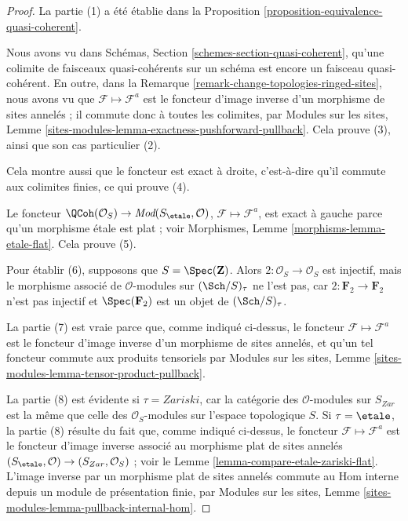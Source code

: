 \begin{proof}
La partie (1) a été établie dans la
Proposition \ref{proposition-equivalence-quasi-coherent}.

\medskip\noindent
Nous avons vu dans Schémas, Section
\ref{schemes-section-quasi-coherent}, qu'une colimite de faisceaux
quasi-cohérents sur un schéma est encore un faisceau quasi-cohérent.
En outre, dans la Remarque
\ref{remark-change-topologies-ringed-sites}, nous avons vu que
$\mathcal{F} \mapsto \mathcal{F}^a$ est le foncteur d'image inverse d'un
morphisme de sites annelés ; il commute donc à toutes les colimites, par
Modules sur les sites, Lemme
\ref{sites-modules-lemma-exactness-pushforward-pullback}.
Cela prouve (3), ainsi que son cas particulier (2).

\medskip\noindent
Cela montre aussi que le foncteur est exact à droite, c'est-à-dire qu'il
commute aux colimites finies, ce qui prouve (4).

\medskip\noindent
Le foncteur $\QCoh(\mathcal{O}_S) \to
\textit{Mod}(S_\etale, \mathcal{O})$,
$\mathcal{F} \mapsto \mathcal{F}^a$, est exact à gauche parce qu'un
morphisme \'etale est plat ; voir Morphismes, Lemme
\ref{morphisms-lemma-etale-flat}. Cela prouve (5).

\medskip\noindent
Pour établir (6), supposons que $S = \Spec(\mathbf{Z})$.
Alors $2 : \mathcal{O}_S \to \mathcal{O}_S$ est injectif, mais le morphisme
associé de $\mathcal{O}$-modules sur $(\Sch/S)_\tau$ ne l'est pas, car
$2 : \mathbf{F}_2 \to \mathbf{F}_2$ n'est pas injectif et
$\Spec(\mathbf{F}_2)$ est un objet de $(\Sch/S)_\tau$.

\medskip\noindent
La partie (7) est vraie parce que, comme indiqué ci-dessus, le foncteur
$\mathcal{F} \mapsto \mathcal{F}^a$ est le foncteur d'image inverse d'un
morphisme de sites annelés, et qu'un tel foncteur commute aux produits
tensoriels par Modules sur les sites, Lemme
\ref{sites-modules-lemma-tensor-product-pullback}.

\medskip\noindent
La partie (8) est évidente si $\tau = Zariski$, car la catégorie des
$\mathcal{O}$-modules sur $S_{Zar}$ est la même que celle des
$\mathcal{O}_S$-modules sur l'espace topologique $S$.
Si $\tau = \etale$, la partie (8) résulte du fait que, comme indiqué
ci-dessus, le foncteur $\mathcal{F} \mapsto \mathcal{F}^a$ est le foncteur
d'image inverse associé au morphisme plat de sites annelés
$(S_\etale, \mathcal{O}) \to (S_{Zar}, \mathcal{O}_S)$ ; voir le
Lemme \ref{lemma-compare-etale-zariski-flat}. L'image inverse par un
morphisme plat de sites annelés commute au Hom interne depuis un module
de présentation finie, par Modules sur les sites, Lemme
\ref{sites-modules-lemma-pullback-internal-hom}.


\end{proof}
